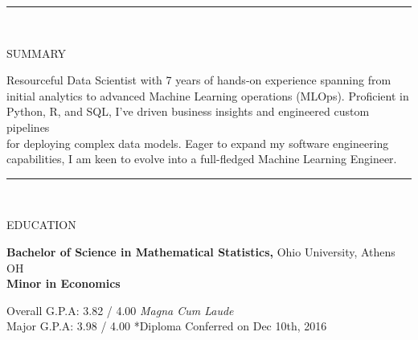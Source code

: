 \documentclass[12pt]{article}
\newcommand{\tab}[1][1cm]{\hspace*{#1}}
\newcommand{\header}[1]{
    \vspace*{-2mm}
    \rule{6.5in}{3pt} \\
    \smallskip
    \begin{large}
	    \textsc{\textcolor{lblue}{#1}}
    \end{large}
    \bigskip
}
\begin{document}
  \pagestyle{empty} %

  \begin{flushleft}
    \header{SUMMARY}

    \tab Resourceful Data Scientist with 7 years of hands-on experience spanning from \\
    \tab initial analytics to advanced Machine Learning operations (MLOps). Proficient in \\
    \tab Python, R, and SQL, I've driven business insights and engineered custom pipelines \\
    \tab for deploying complex data models. Eager to expand my software engineering \\
    \tab capabilities, I am keen to evolve into a full-fledged Machine Learning Engineer. \\

    \smallskip
  \end{flushleft}
  
  \begin{flushleft}
    \header{EDUCATION}

    \textbf{Bachelor of Science in Mathematical Statistics,} \hfill Ohio University, Athens OH \\
    \textbf{Minor in Economics}

    \tab[0.5cm] Overall G.P.A:  3.82 / 4.00 \tab[0.25cm] \textit{Magna Cum Laude} \\
    \tab[0.5cm] \hspace*{2.08mm}Major G.P.A: 3.98 / 4.00  \hfill \small{*Diploma Conferred on Dec 10th, 2016}

    \smallskip
  \end{flushleft}
\end{document}
